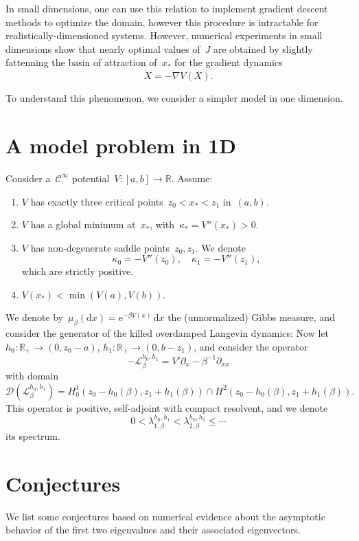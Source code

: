 \documentclass{article}
\newcommand{\cL}{\mathcal{L}}
\newcommand{\R}{\mathbb{R}}
\begin{document}
        In small dimensions, one can use this relation to implement gradient descent methods to optimize the domain, however this procedure is intractable for realistically-dimensioned systems.
        However, numerical experiments in small dimensions show that nearly optimal values of~$J$ are obtained by slightly fattenning the basin of attraction of~$x_*$ for the gradient dynamics
        \[ \dot X = -\nabla V(X).\]

        To understand this phenomenon, we consider a simpler model in one dimension.

    \section{A model problem in 1D}

    Consider a~$\mathcal C^\infty$ potential~$V:[a,b]\to \mathbb R$. Assume:

    \begin{enumerate}
        \item $V$ has exactly three critical points~$z_0 < x_* < z_1$ in~$(a,b)$.
        \item $V$ has a global minimum at~$x_*$, with~$\kappa_* = V''(x_*)>0$.
        \item $V$ has non-degenerate saddle points~$z_0,z_1$. We denote $$\kappa_0=-V''(z_0),\quad\kappa_1=-V''(z_1),$$ which are strictly positive.
        \item $V(x_*) < \min(V(a),V(b))$.
    \end{enumerate}

    We denote by~$\mu_\beta(\mathrm d x) = \mathrm e^{-\beta V(x)}\,\mathrm d x$ the (unnormalized) Gibbs measure, and consider the generator of the killed overdamped Langevin dynamics:
    Now let~$h_0 : \R_+ \to (0,z_0-a)$, $h_1:\R_+ \to (0,b-z_1)$, and consider the operator
    \[-\cL_\beta^{h_0,h_1} =  V' \partial_x - \beta^{-1}\partial_{xx}\]
    with domain $$\mathcal{D}(\cL_\beta^{h_0,h_1})=H_0^1(z_0-h_0(\beta),z_1+h_1(\beta)) \cap H^2(z_0-h_0(\beta),z_1+h_1(\beta)).$$ This operator is positive, self-adjoint with compact resolvent, and we denote
    $$ 0 < \lambda_{1,\beta}^{h_0,h_1} < \lambda_{2,\beta}^{h_0,h_1} \leq \dotsm $$
    its spectrum.

    \section{Conjectures}
    We list some conjectures based on numerical evidence about the asymptotic behavior of the first two eigenvalues and their associated eigenvectors.
\end{document}
